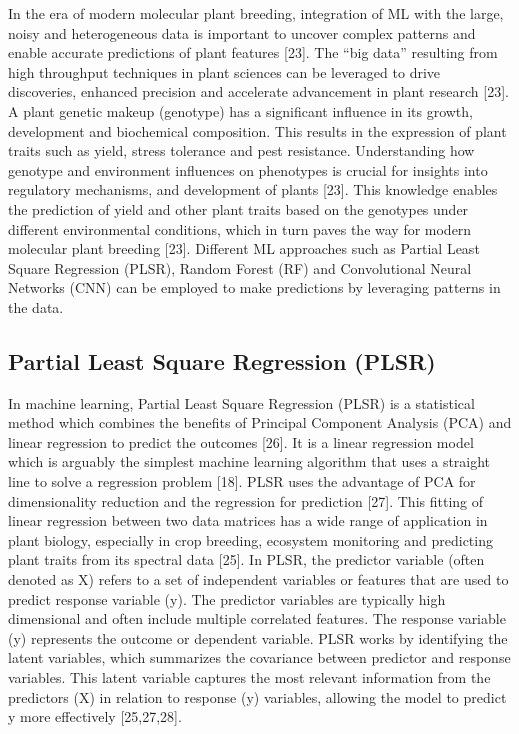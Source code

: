 \documentclass[12pt,a4paper]{article}
\begin{document}
In the era of modern molecular plant breeding, integration of ML with the large, noisy and heterogeneous data is important to uncover complex patterns and enable accurate predictions of plant features [23]. The “big data” resulting from high throughput techniques in plant sciences can be leveraged 
to drive discoveries, enhanced precision and accelerate advancement in plant research [23]. A plant genetic makeup (genotype) has a significant influence in its growth, development and biochemical composition. This results in the expression of plant traits such as yield, stress tolerance and pest resistance. 
Understanding how genotype and environment influences on phenotypes is crucial for insights into regulatory mechanisms, and development of plants [23]. This knowledge enables the  prediction of yield and other plant traits based on the genotypes under different environmental conditions, which in turn paves the 
way for modern molecular plant breeding [23]. Different ML approaches such as Partial Least Square Regression (PLSR), Random Forest (RF) and Convolutional Neural Networks (CNN)  can be employed to make predictions by leveraging patterns in the data. \\

\subsection{Partial Least Square Regression (PLSR)}
In machine learning, Partial Least Square Regression (PLSR) is a statistical method which combines the benefits of Principal Component Analysis (PCA) and linear regression to predict the outcomes [26]. It is a linear regression model which is arguably the simplest machine learning algorithm that uses a straight line to solve a regression problem [18]. PLSR uses the advantage of PCA for dimensionality reduction and the regression for prediction [27].
This fitting of linear regression between two data matrices has a wide range of application in plant biology, especially in crop breeding, ecosystem monitoring and predicting plant traits from its spectral data [25]. In PLSR, the predictor variable (often denoted as X) refers to a set of independent 
variables or features that are used to predict response variable (y). The predictor variables are typically high dimensional and often include multiple correlated features. The response variable (y) represents the outcome or dependent variable. PLSR works by identifying the latent variables, which 
summarizes the covariance between predictor and response variables. This latent variable captures the most relevant information from the predictors (X) in relation to response (y) variables, allowing the model to predict y more effectively [25,27,28]. \\
\end{document}
